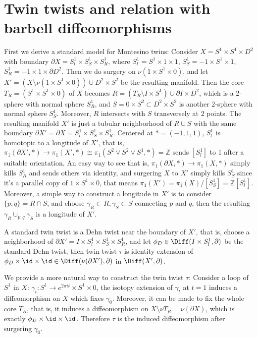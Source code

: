 \chapter{Twin twists and relation with barbell diffeomorphisms}
\label{chap:twin-twists-and-relation-with-barbell-diffeomorphisms}

First we derive a standard model for Montesino twins: Consider $X=S^1\times S^1\times D^2$ with boundary $\partial X= S_l^1\times S_S^1\times S_R^1$, where $S_l^1=S^1\times 1\times 1$, $S_S^1=-1\times S^1\times 1$, $S_R^1={-1}\times 1\times \partial D^2$. Then we do surgery on $\nu(1\times S^1\times 0)$, and let $X'=(X\setminus \nu(1\times S^1\times 0))\cup D^2\times S^2$ be the resulting manifold. Then the core $T_R=(S^1\times S^1\times 0)$ of $X$ becomes $R=(T_R\setminus I\times S^1 )\cup \partial I\times D^2$, which is a 2-sphere with normal sphere $S_R^1$, and $S=0\times S^2\subset D^2\times S^2$ is another 2-sphere with normal sphere $S_S^1$. Moreover, $R$ intersects with $S$ transversely at 2 points. The resulting manifold $X'$ is just a tubular neighborhood of $R\cup S$ with the same boundary $\partial X'=\partial X=S_l^1\times S_S^1\times S_R^1$. Centered at $*=(-1,1,1)$, $S_l^1$ is homotopic to a longitude of $X'$, that is, $\pi_1(\partial X',*)\to \pi_1(X',*)\cong \pi_1(S^2\vee S^2\vee S^1,*)=\mathbb{Z}$ sends $[S_l^1]$ to 1 after a suitable orientation. An easy way to see that is, $\pi_1(\partial X,*)\to \pi_1(X,*)$ simply kills $S_R^1$ and sends others via identity, and surgering $X$ to $X'$ simply kills $S_S^1$ since it's a parallel copy of $1\times S^1\times 0$, that means $\pi_1(X')=\pi_1(X)/[S_S^1]=\mathbb{Z}[S_l^1]$. Moreover, a simple way to construct a longitude in $X'$ is to consider $\{p,q\}=R\cap S$, and choose $\gamma_R\subset R, \gamma_S\subset S$ connecting $p$ and $q$, then the resulting $\gamma_R\cup_{p,q} \gamma_S$ is a longitude of $X'$. 

A standard twin twist is a Dehn twist near the boundary of $X'$, that is, choose a neighborhood of $\partial X'=I\times S_l^1\times S_S^1\times S_R^1$, and let $\phi_D\in \Diff(I\times S_l^1,\partial)$ be the standard Dehn twist, then twin twist $\tau$ is identity-extension of $\phi_D\times \id\times \id\in \Diff(\nu(\partial X'),\partial)$ in $\Diff(X',\partial)$.

We provide a more natural way to construct the twin twist $\tau$: Consider a loop of $S^1$ in $X$: $\gamma_t: S^1\to e^{2\pi i t}\times S^1\times 0$, the isotopy extension of $\gamma_t$ at $t=1$ induces a diffeomorphism on $X$ which fixes $\gamma_0$. Moreover, it can be made to fix the whole core $T_R$, that is, it induces a diffeomorphism on $X\setminus \nu T_R=\nu (\partial X)$, which is exactly $\phi_D\times \id\times \id$. Therefore $\tau$ is the induced diffeomorphism after surgering $\gamma_0$. 

